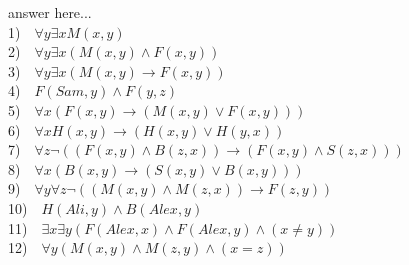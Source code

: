 \documentclass[a4paper,12pt]{article}
\begin{document}
\begin{tcolorbox}
answer here...\\
1)$\quad\forall y \exists x M(x,y)$\\
2)$\quad\forall y \exists x (M(x,y)\land F(x,y))$\\
3)$\quad\forall y \exists x(M(x,y)\rightarrow F(x,y))$\\
4)$\quad F(Sam,y)\land F(y,z)$\\
5)$\quad\forall x (F(x,y)\rightarrow(M(x,y)\lor F(x,y)))$\\
6)$\quad\forall x H(x,y)\rightarrow(H(x,y)\lor H(y,x))$\\
7)$\quad\forall z\neg((F(x,y)\land B(z,x))\rightarrow(F(x,y)\land S(z,x)))$\\
8)$\quad\forall x (B(x,y)\rightarrow (S(x,y)\lor B(x,y)))$\\
9)$\quad\forall y\forall z \neg((M(x,y)\land M(z,x))\rightarrow F(z,y))$\\
10)$\quad H(Ali,y)\land B(Alex,y)$\\
11)$\quad\exists x \exists y (F(Alex,x)\land F(Alex,y)\land (x\neq y))$\\
12)$\quad\forall y (M(x,y)\land M(z,y)\land (x=z))$\\

\vspace{1cm} %
\end{tcolorbox}


\newpage
\end{document}
